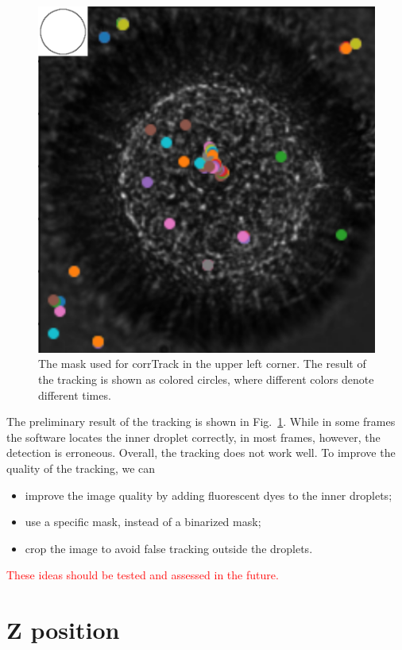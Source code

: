 \documentclass[onecolumn,aps, pre,amsmath,amssymb,longbibliography,12pt]{revtex4-2}
\begin{document}
\begin{figure}
  \includegraphics{mask-and-result}
  \caption{The mask used for corrTrack in the upper left corner.
  The result of the tracking is shown as colored circles, where different colors denote different times.}
  \label{fig:mask-and-result}
\end{figure}

The preliminary result of the tracking is shown in Fig.~\ref{fig:mask-and-result}.
While in some frames the software locates the inner droplet correctly, in most frames, however, the detection is erroneous.
Overall, the tracking does not work well.
To improve the quality of the tracking, we can
\begin{itemize}
  \item improve the image quality by adding fluorescent dyes to the inner droplets;
  \item use a specific mask, instead of a binarized mask;
  \item crop the image to avoid false tracking outside the droplets.
\end{itemize}

\textcolor{red}{These ideas should be tested and assessed in the future.}

\section{Z position}
\end{document}
